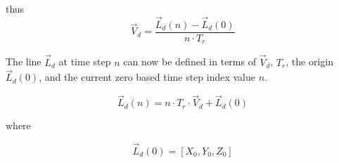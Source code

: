 thus
\begin{equation}
\vec{V}_d = \frac{\vec{L}_d(n) - \vec{L}_d(0)}{n \cdot T_r}
\end{equation}

The line $\vec{L}_d$ at time step $n$ can now be defined in terms of $\vec{V}_d$, $T_r$, the origin $\vec{L}_d(0)$, and the current zero based time step index value $n$.

\begin{equation}
\vec{L}_d(n) = n \cdot T_r \cdot \vec{V}_d + \vec{L}_d(0)
\end{equation}







where 

\begin{equation}
\vec{L}_d(0) = \left[X_0, Y_0, Z_0\right]
\end{equation}



